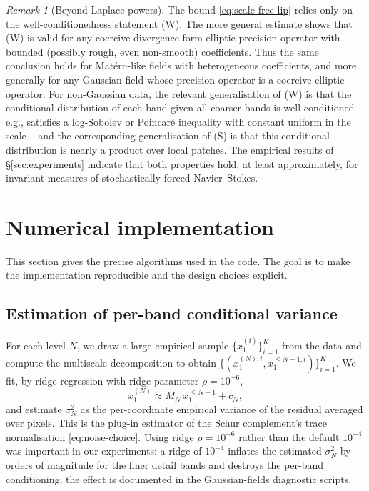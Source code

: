 \documentclass[11pt]{amsart}
\theoremstyle{remark}
\newtheorem{remark}[theorem]{Remark}
\numberwithin{equation}{section}
\begin{document}
\begin{remark}[Beyond Laplace powers]
The bound \eqref{eq:scale-free-lip} relies only on the well-conditionedness statement (W). The more general estimate \cite[Theorem 13.10]{owhadi2019operator} shows that (W) is valid for any coercive divergence-form elliptic precision operator with bounded (possibly rough, even non-smooth) coefficients. Thus the same conclusion holds for Mat\'ern-like fields with heterogeneous coefficients, and more generally for any Gaussian field whose precision operator is a coercive elliptic operator. For non-Gaussian data, the relevant generalisation of (W) is that the conditional distribution of each band given all coarser bands is well-conditioned -- e.g., satisfies a log-Sobolev or Poincar\'e inequality with constant uniform in the scale -- and the corresponding generalisation of (S) is that this conditional distribution is nearly a product over local patches. The empirical results of \S\ref{sec:experiments} indicate that both properties hold, at least approximately, for invariant measures of stochastically forced Navier--Stokes.
\end{remark}

\section{Numerical implementation}
\label{sec:numerics}
This section gives the precise algorithms used in the code. The goal is to make the implementation reproducible and the design choices explicit.

\subsection{Estimation of per-band conditional variance}
For each level $N$, we draw a large empirical sample $\{x_1^{(i)}\}_{i=1}^K$ from the data and compute the multiscale decomposition to obtain $\{(x_1^{(N),i},x_1^{\le N-1,i})\}_{i=1}^K$. We fit, by ridge regression with ridge parameter $\rho=10^{-6}$,
\begin{equation}
 x_1^{(N)} \approx M_N\, x_1^{\le N-1} + c_N,
\end{equation}
and estimate $\sigma_N^2$ as the per-coordinate empirical variance of the residual averaged over pixels. This is the plug-in estimator of the Schur complement's trace normalisation \eqref{eq:noise-choice}. Using ridge $\rho=10^{-6}$ rather than the default $10^{-4}$ was important in our experiments: a ridge of $10^{-4}$ inflates the estimated $\sigma_N^2$ by orders of magnitude for the finer detail bands and destroys the per-band conditioning; the effect is documented in the Gaussian-fields diagnostic scripts.
\end{document}
